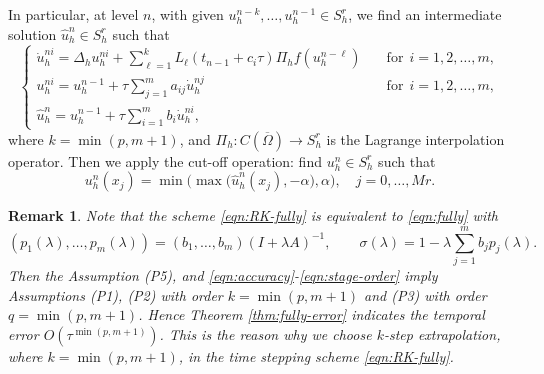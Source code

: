 \documentclass[10pt,final,leqno,onefignum,onetabnum]{siamltex}%
\newtheorem{remark}{Remark}[section]
\begin{document}

In particular, at level $n$, with given $u_h^{n-k},\ldots, u_h^{n-1}\in S_h^r$, we find an intermediate solution $\hat u_h^{n}\in S_h^r$ such that
\begin{equation}\label{eqn:RK-fully}
    \begin{cases}
    \dot u_h^{ni} = \Delta_h u_h^{ni} +  \sum_{\ell=1}^k L_{\ell}(t_{n-1}+c_i\tau)\Pi_h f(u_h^{n-\ell}) &\quad \text{for} ~~i=1,2,\dots,m, \\ %
    u_h^{ni} = u_h^{n-1} + \tau \sum_{j=1}^m a_{ij} \dot u_h^{nj} &\quad \text{for} ~~i=1,2,\dots,m, \\
    \hat u_h^{n} = u_h^{n-1} + \tau \sum_{i=1}^m b_i \dot u_h^{ni},
  \end{cases}
\end{equation}
where $k=\min(p,m+1)$, and $\Pi_h:C(\overline\Omega)\rightarrow S_h^r$ is the Lagrange interpolation operator.
Then we apply the cut-off operation: find $u_h^n\in S_h^r$ such that
\begin{equation}\label{eqn:RK-cut}
u_h^n(x_j)  = \min\big(\max \big(\hat u_h^n(x_j), - \alpha \big) , \alpha \big),  \quad j=0,\dots,Mr.
\end{equation}


\begin{remark}\label{rem:equiv}
Note
that the scheme \eqref{eqn:RK-fully} is equivalent to \eqref{eqn:fully} with
$$  (p_1(\lambda),\ldots,p_m(\lambda))= (b_1, \ldots, b_m) (I+\lambda A)^{-1},\qquad
 \sigma(\lambda) = 1-\lambda \sum_{j=1}^m b_j p_j(\lambda). $$
Then the Assumption (P5), and \eqref{eqn:accuracy}-\eqref{eqn:stage-order}
imply Assumptions (P1), (P2) with order $k=\min(p,m+1)$ and (P3) with order $q=\min(p,m+1)$.
Hence Theorem \ref{thm:fully-error} indicates the temporal error $O(\tau^{\min(p,m+1)})$.
This is the reason why we choose $k$-step extrapolation, where $k=\min(p,m+1)$, in the time stepping scheme \eqref{eqn:RK-fully}.
\end{remark}
\end{document}
